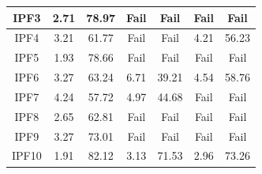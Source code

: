 {\begin{landscape}
\begin{table}[htbp]
\begin{tabular}{| c | c | c | c | c | c | c |}
\hline
IPF3 & 2.71 & 78.97 & Fail & Fail & Fail & Fail\\
\hline
IPF4 & 3.21 & 61.77 & Fail & Fail & 4.21 & 56.23\\
\hline
IPF5 & 1.93 & 78.66 & Fail & Fail & Fail & Fail\\	
\hline
IPF6 & 3.27 & 63.24 & 6.71 & 39.21 & 4.54 & 58.76\\	
\hline
IPF7 & 4.24 & 57.72 & 4.97 & 44.68 & Fail & Fail\\	
\hline
IPF8 & 2.65 & 62.81 & Fail & Fail & Fail & Fail\\	
\hline
IPF9 & 3.27 & 73.01 & Fail & Fail & Fail & Fail\\
\hline
IPF10 & 1.91 & 82.12 & 3.13 & 71.53 & 2.96 & 73.26\\								
\hline
\end{tabular}
\end{table}
\end{landscape}
\restoregeometry

}
